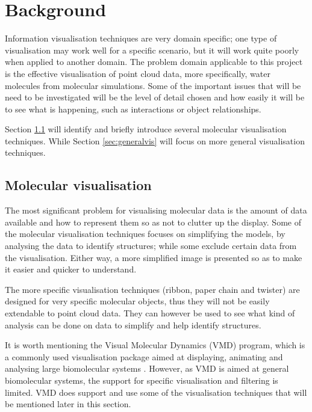 \graphicspath{{./background/}}

\chapter{Background}
\label{chap:background}


Information visualisation techniques are very domain specific; one type of
visualisation may work well for a specific scenario, but it will work quite
poorly when applied to another domain. The problem domain applicable to this
project is the effective visualisation of point cloud data, more specifically,
water molecules from molecular simulations. Some of the important issues that
will be need to be investigated will be the level of detail chosen and how
easily it will be to see what is happening, such as interactions or object
relationships.

Section \ref{sec:molecularvis} will identify and briefly introduce several
molecular visualisation techniques. While Section \ref{sec:generalvis} will
focus on more general visualisation techniques.


\section{Molecular visualisation}
\label{sec:molecularvis}

The most significant problem for visualising molecular data is the amount of
data available and how to represent them so as not to clutter up the display.
Some of the molecular visualisation techniques focuses on simplifying the
models, by analysing the data to identify structures; while some exclude
certain data from the visualisation. Either way, a more simplified image is
presented so as to make it easier and quicker to understand.

The more specific visualisation techniques (ribbon, paper chain and twister) are
designed for very specific molecular objects, thus they will not be easily
extendable to point cloud data. They can however be used to see what kind of
analysis can be done on data to simplify and help identify structures.

It is worth mentioning the Visual Molecular Dynamics (VMD) \citep{humphrey96}
program, which is a commonly used visualisation package aimed at displaying,
animating and analysing large biomolecular systems \citep{VMD}. However, as VMD
is aimed at general biomolecular systems, the support for specific
visualisation and filtering is limited. VMD does support and use some of the
visualisation techniques that will be mentioned later in this section.

